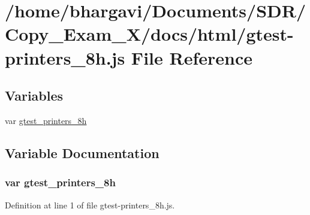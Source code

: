 \hypertarget{gtest-printers__8h_8js}{}\section{/home/bhargavi/\+Documents/\+S\+D\+R/\+Copy\+\_\+\+Exam\+\_\+X/docs/html/gtest-\/printers\+\_\+8h.js File Reference}
\label{gtest-printers__8h_8js}
\subsection*{Variables}
\begin{DoxyCompactItemize}
\item 
var \hyperlink{gtest-printers__8h_8js_a4e91da20dfed3d1696c4dd3a37fabf67}{gtest\+\_\+printers\+\_\+8h}
\end{DoxyCompactItemize}


\subsection{Variable Documentation}
\subsubsection[{\texorpdfstring{gtest\+\_\+printers\+\_\+8h}{gtest_printers_8h}}]{\setlength{\rightskip}{0pt plus 5cm}var gtest\+\_\+printers\+\_\+8h}\hypertarget{gtest-printers__8h_8js_a4e91da20dfed3d1696c4dd3a37fabf67}{}\label{gtest-printers__8h_8js_a4e91da20dfed3d1696c4dd3a37fabf67}


Definition at line 1 of file gtest-\/printers\+\_\+8h.\+js.

